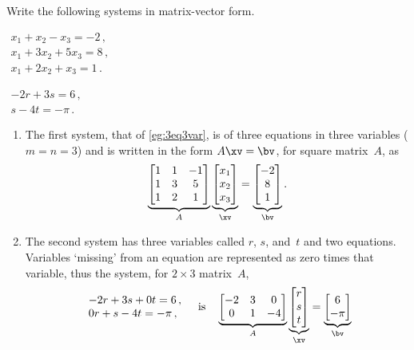 \begin{example} \label{eg:matvecsys}
Write the following systems in matrix-vector form.
\begin{Parts}
\item \(\begin{array}{l}
x_1+x_2-x_3=-2\,,\\
x_1+3x_2+5x_3=8\,,\\
x_1+2x_2+x_3=1\,.
\end{array}\)

\item \(\begin{array}{l} -2r+3s=6\,,\\s-4t=-\pi\,. \end{array}\)
\end{Parts}
\begin{solution} 
\begin{enumerate}
\item The first system, that of \cref{eg:3eq3var}, is of three equations in three variables (\(m=n=3\)) and is written in the form \(A\xv=\bv\), for square matrix~\(A\), as
\begin{equation*}
\underbrace{\begin{bmatrix} 1&1&-1\\ 1&3&5\\1&2&1 \end{bmatrix}}_A
\underbrace{\begin{bmatrix} x_1\\x_2\\x_3 \end{bmatrix}}_\xv
=\underbrace{\begin{bmatrix} -2\\8\\1 \end{bmatrix}}_\bv .
\end{equation*}

\item The second system has three variables called \(r\), \(s\), and~\(t\) and two equations.
Variables `missing' from an equation are represented as zero times that variable, thus the system, for \(2\times3\) matrix~\(A\),
\begin{equation*}
\begin{array}{l} -2r+3s+0t=6\,,\\0r+s-4t=-\pi\,, \end{array}
\quad\text{is}\quad
\underbrace{\begin{bmatrix} -2&3&0\\ 0&1&-4 \end{bmatrix}}_A
\underbrace{\begin{bmatrix} r\\s\\t \end{bmatrix}}_\xv
=\underbrace{\begin{bmatrix} 6\\-\pi \end{bmatrix}}_\bv 
\end{equation*}
\end{enumerate}
\end{solution}
\end{example}



